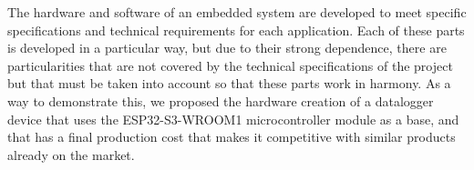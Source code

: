 
The hardware and software of an embedded system are developed to meet specific specifications and technical requirements for each application. Each of these parts is developed in a particular way, but due to their strong dependence, there are particularities that are not covered by the technical specifications of the project but that must be taken into account so that these parts work in harmony. As a way to demonstrate this, we proposed the hardware creation of a datalogger device that uses the ESP32-S3-WROOM1 microcontroller module as a base, and that has a final production cost that makes it competitive with similar products already on the market.

